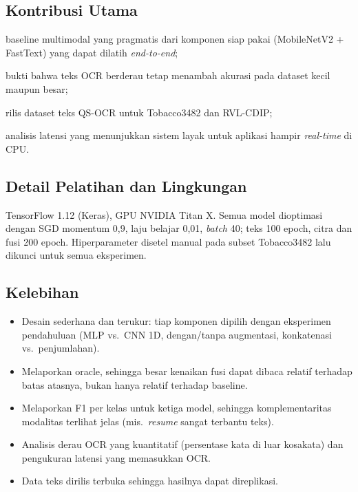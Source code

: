 \subsection{Kontribusi Utama}
\begin{enumerate*}[label=(\alph*)]
  \item baseline multimodal yang pragmatis dari komponen siap pakai (MobileNetV2 +
        FastText) yang dapat dilatih \emph{end-to-end};
  \item bukti bahwa teks OCR berderau tetap menambah akurasi pada dataset kecil maupun
        besar;
  \item rilis dataset teks QS-OCR untuk Tobacco3482 dan RVL-CDIP;
  \item analisis latensi yang menunjukkan sistem layak untuk aplikasi hampir \emph{real-time}
        di CPU.
\end{enumerate*}

\subsection{Detail Pelatihan dan Lingkungan}
TensorFlow 1.12 (Keras), GPU NVIDIA Titan X. Semua model dioptimasi dengan SGD momentum
0,9, laju belajar 0,01, \emph{batch} 40; teks 100 epoch, citra dan fusi 200 epoch.
Hiperparameter disetel manual pada subset Tobacco3482 lalu dikunci untuk semua eksperimen.

\subsection{Kelebihan}
\begin{itemize}
  \item Desain sederhana dan terukur: tiap komponen dipilih dengan eksperimen pendahuluan
        (MLP vs.\ CNN 1D, dengan/tanpa augmentasi, konkatenasi vs.\ penjumlahan).
  \item Melaporkan oracle, sehingga besar kenaikan fusi dapat dibaca relatif terhadap batas
        atasnya, bukan hanya relatif terhadap baseline.
  \item Melaporkan F1 per kelas untuk ketiga model, sehingga komplementaritas modalitas
        terlihat jelas (mis.\ \emph{resume} sangat terbantu teks).
  \item Analisis derau OCR yang kuantitatif (persentase kata di luar kosakata) dan
        pengukuran latensi yang memasukkan OCR.
  \item Data teks dirilis terbuka sehingga hasilnya dapat direplikasi.
\end{itemize}

